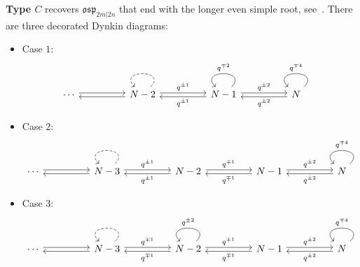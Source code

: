 \documentclass{amsart}
\def\fosp{\mathfrak{osp}}
\begin{document}
\medskip 

\noindent \textbf{Type $C$} recovers $\fosp_{2m|2n}$ that end with the longer even simple root, see~\cite[\S 3.1, diagrams ($C_N$)]{Y1}. There are three decorated Dynkin diagrams:

\medskip 

\begin{itemize}[leftmargin=*]

\item Case $1$: 
\begin{equation}
\label{eqn:dynkin c 1}
\begin{tikzcd}
\cdots &&  {N-2} && {N-1} && N
\arrow["q^{\pm 2}", shift left=2pt, from=1-7, to=1-5]
\arrow["q^{\pm 2}", shift left=2pt, from=1-5, to=1-7]
\arrow["q^{\pm 1}", shift left=2pt, from=1-5, to=1-3] 
\arrow["q^{\pm 1}", shift left=2pt, from=1-3, to=1-5] 
\arrow[shift left=2pt, from=1-3, to=1-1]
\arrow[shift left=2pt, from=1-1, to=1-3]
\arrow["q^{\mp 4}"', from=1-7, to=1-7, looseness=4]
\arrow["q^{\mp 2}"', from=1-5, to=1-5, looseness=4]
\arrow[dashed, from=1-3, to=1-3, looseness=4]
\end{tikzcd}
\end{equation}

\medskip 

\item Case $2$: 
\begin{equation}
\label{eqn:dynkin c 2}
\begin{tikzcd}
\cdots && N-3 && {N-2} && {N-1} && N
\arrow["q^{\pm 2}", shift left=2pt, from=1-9, to=1-7]
\arrow["q^{\pm 2}", shift left=2pt, from=1-7, to=1-9]
\arrow["q^{\mp 1}", shift left=2pt, from=1-7, to=1-5]
\arrow["q^{\mp 1}", shift left=2pt, from=1-5, to=1-7]
\arrow["q^{\pm 1}", shift left=2pt, from=1-5, to=1-3]
\arrow["q^{\pm 1}", shift left=2pt, from=1-3, to=1-5]
\arrow[shift left=2pt, from=1-3, to=1-1]
\arrow[shift left=2pt, from=1-1, to=1-3]
\arrow["q^{\mp 4}"', from=1-9, to=1-9, looseness=4]
\arrow[dashed, from=1-3, to=1-3, looseness=4]
\end{tikzcd}
\end{equation}

\medskip 

\item Case $3$: 
\begin{equation}
\label{eqn:dynkin c 3}
\begin{tikzcd}
\cdots && N-3 && {N-2} && {N-1} && N
\arrow["q^{\pm 2}", shift left=2pt, from=1-9, to=1-7]
\arrow["q^{\pm 2}", shift left=2pt, from=1-7, to=1-9]
\arrow["q^{\mp 1}", shift left=2pt, from=1-7, to=1-5]
\arrow["q^{\mp 1}", shift left=2pt, from=1-5, to=1-7]
\arrow["q^{\mp 1}", shift left=2pt, from=1-5, to=1-3]
\arrow["q^{\mp 1}", shift left=2pt, from=1-3, to=1-5]
\arrow[shift left=2pt, from=1-3, to=1-1]
\arrow[shift left=2pt, from=1-1, to=1-3]
\arrow["q^{\mp 4}"', from=1-9, to=1-9, looseness=4]
\arrow["q^{\pm 2}"', from=1-5, to=1-5, looseness=4]
\arrow[dashed, from=1-3, to=1-3, looseness=4]
\end{tikzcd}
\end{equation}

\end{itemize}
\end{document}
